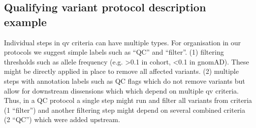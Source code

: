 \subsection{Qualifying variant protocol description example}\label{sec:protocol_description_example}

Individual steps in \ac{qv} criteria can have multiple types. 
For organisation in our protocols we suggest simple labels such as ``QC'' and ``filter''. 
(1) filtering thresholds such as allele frequency (e.g. >0.1 in cohort, <0.1 in gnomAD). These might be directly applied in place to remove all affected variants. 
(2) multiple steps with annotation labels such as QC flags which do not remove variants but allow for downstream dissensions which which depend on multiple \ac{qv} criteria. 
Thus, in a QC protocol a single step might run and filter all variants from criteria (1 ``filter'') and another filtering step might depend on several combined criteria (2 ``QC'') which were added upstream.

